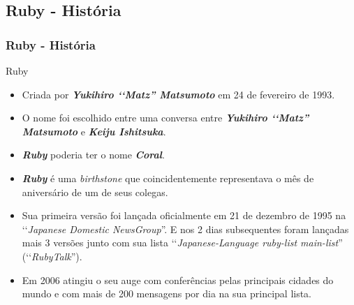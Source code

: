 \subsection{Ruby - História} 
\begin{frame}
 \frametitle{Ruby - História}
 
   \begin{block}{Ruby}
  
    \begin{itemize}
   
     \item Criada por \emph{\textbf{Yukihiro ‘‘Matz'' Matsumoto}} em 24 de fevereiro de 1993.          
     
     \item O nome foi escolhido entre uma conversa entre \emph{\textbf{Yukihiro ‘‘Matz'' Matsumoto}} e 
     \emph{\textbf{Keiju Ishitsuka}}.
     
     \item \emph{\textbf{Ruby}} poderia ter o nome \emph{\textbf{Coral}}.
     
     \item \emph{\textbf{Ruby}} é uma \emph{birthstone} que coincidentemente representava o mês de aniversário de 
     um de seus colegas.          
   
     \item Sua primeira versão foi lançada oficialmente em 21 de dezembro de 1995 na 
     ‘‘\emph{Japanese Domestic NewsGroup}''. E nos 2 dias subsequentes foram lançadas mais 3 versões junto 
     com sua lista ‘‘\emph{Japanese-Language ruby-list main-list}'' (‘‘\emph{RubyTalk}'').
   
   \item Em 2006 atingiu o seu auge com conferências pelas principais cidades do mundo e com mais de 200 mensagens
   por dia na sua principal lista.
   
    \end{itemize}
   
   \end{block} 
 
\end{frame}


